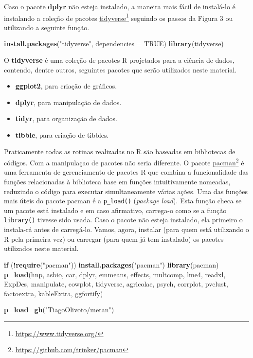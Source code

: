 \documentclass[]{book}
\makeatletter
\newenvironment{Shaded}{\begin{snugshade}}{\end{snugshade}}
\newcommand{\ControlFlowTok}[1]{\textcolor[rgb]{0.13,0.29,0.53}{\textbf{#1}}}
\newcommand{\DataTypeTok}[1]{\textcolor[rgb]{0.13,0.29,0.53}{#1}}
\newcommand{\KeywordTok}[1]{\textcolor[rgb]{0.13,0.29,0.53}{\textbf{#1}}}
\newcommand{\NormalTok}[1]{#1}
\newcommand{\OperatorTok}[1]{\textcolor[rgb]{0.81,0.36,0.00}{\textbf{#1}}}
\newcommand{\OtherTok}[1]{\textcolor[rgb]{0.56,0.35,0.01}{#1}}
\newcommand{\StringTok}[1]{\textcolor[rgb]{0.31,0.60,0.02}{#1}}
\providecommand{\tightlist}{%
  \setlength{\itemsep}{0pt}\setlength{\parskip}{0pt}}
\let\rmarkdownfootnote\footnote%
\def\footnote{\protect\rmarkdownfootnote}
\newcommand{\indf}[1]{\index[function]{#1@\texttt{#1()}|ST}}
\makeatother
\begin{document}
Caso o pacote \textbf{dplyr} não esteja instalado, a maneira mais fácil de instalá-lo é instalando a coleção de pacotes \href{https://www.tidyverse.org/}{tidyverse}\footnote{\url{https://www.tidyverse.org/}} seguindo os passos da Figura 3 ou utilizando a seguinte função.

\begin{Shaded}
\begin{Highlighting}[]
\KeywordTok{install.packages}\NormalTok{(}\StringTok{"tidyverse"}\NormalTok{, }\DataTypeTok{dependencies =} \OtherTok{TRUE}\NormalTok{)}
\KeywordTok{library}\NormalTok{(tidyverse)}
\end{Highlighting}
\end{Shaded}

O \textbf{tidyverse} é uma coleção de pacotes R projetados para a ciência de dados, contendo, dentre outros, seguintes pacotes que serão utilizados neste material.

\begin{itemize}
\tightlist
\item
  \textbf{ggplot2}, para criação de gráficos.
\item
  \textbf{dplyr}, para manipulação de dados.
\item
  \textbf{tidyr}, para organização de dados.
\item
  \textbf{tibble}, para criação de tibbles.
\end{itemize}

Praticamente todas as rotinas realizadas no R são baseadas em bibliotecas de códigos. Com a manipulaçao de pacotes não seria diferente. O pacote \href{https://github.com/trinker/pacman}{pacman}\footnote{\url{https://github.com/trinker/pacman}} é uma ferramenta de gerenciamento de pacotes R que combina a funcionalidade das funções relacionadas à biblioteca base em funções intuitivamente nomeadas, reduzindo o código para executar simultaneamente várias ações. Uma das funções mais úteis do pacote pacman é a \texttt{p\_load()}\indf{p\_load} (\emph{package load}). Esta função checa se um pacote está instalado e em caso afirmativo, carrega-o como se a função \texttt{library()} tivesse sido usada. Caso o pacote não esteja instalado, ela primeiro o instala-rá antes de carregá-lo. Vamos, agora, instalar (para quem está utilizando o R pela primeira vez) ou carregar (para quem já tem instalado) os pacotes utilizados neste material.

\begin{Shaded}
\begin{Highlighting}[]
\ControlFlowTok{if}\NormalTok{ (}\OperatorTok{!}\KeywordTok{require}\NormalTok{(}\StringTok{"pacman"}\NormalTok{)) }\KeywordTok{install.packages}\NormalTok{(}\StringTok{"pacman"}\NormalTok{)}
\KeywordTok{library}\NormalTok{(pacman)}
\KeywordTok{p_load}\NormalTok{(hnp, asbio, car, dplyr, emmeans, effects, multcomp, lme4, readxl,}
\NormalTok{       ExpDes, manipulate, cowplot, tidyverse, agricolae, psych, corrplot,}
\NormalTok{       pvclust, factoextra, kableExtra, ggfortify)}

\KeywordTok{p_load_gh}\NormalTok{(}\StringTok{"TiagoOlivoto/metan"}\NormalTok{)}
\end{Highlighting}
\end{Shaded}
\end{document}
